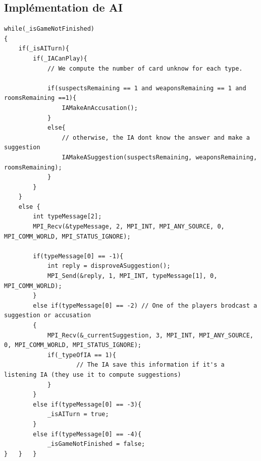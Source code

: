 \documentclass[a4paper,10pt]{article}
\begin{document}
	 \subsection{Implémentation de AI} 	\hypertarget{AIimplementation}{}
	 
\begin{lstlisting}
while(_isGameNotFinished)
{
	if(_isAITurn){
		if(_IACanPlay){
			// We compute the number of card unknow for each type.
			
			if(suspectsRemaining == 1 and weaponsRemaining == 1 and roomsRemaining ==1){
				IAMakeAnAccusation();
			}
			else{
				// otherwise, the IA dont know the answer and make a suggestion
				IAMakeASuggestion(suspectsRemaining, weaponsRemaining, roomsRemaining);
			}
		}
	}
	else {
		int typeMessage[2];
		MPI_Recv(&typeMessage, 2, MPI_INT, MPI_ANY_SOURCE, 0, MPI_COMM_WORLD, MPI_STATUS_IGNORE);
			
		if(typeMessage[0] == -1){
			int reply = disproveASuggestion();
			MPI_Send(&reply, 1, MPI_INT, typeMessage[1], 0, MPI_COMM_WORLD);
		}
		else if(typeMessage[0] == -2) // One of the players brodcast a suggestion or accusation
		{	
			MPI_Recv(&_currentSuggestion, 3, MPI_INT, MPI_ANY_SOURCE, 0, MPI_COMM_WORLD, MPI_STATUS_IGNORE);
			if(_typeOfIA == 1){
					// The IA save this information if it's a listening IA (they use it to compute suggestions)
			}
		}
		else if(typeMessage[0] == -3){
			_isAITurn = true;
		}
		else if(typeMessage[0] == -4){
			_isGameNotFinished = false;	
}	}	}


\end{lstlisting}
\fontfamily{}
	  
\end{document}
